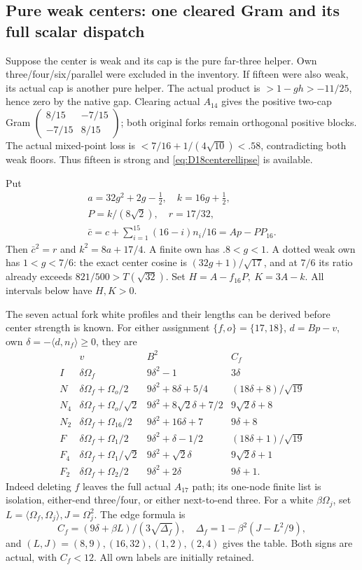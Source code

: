 \documentclass[11pt]{article}
\theoremstyle{definition}
\theoremstyle{remark}
\newcommand{\ip}[2]{\langle #1,#2\rangle}
\begin{document}
\subsection{Pure weak centers: one cleared Gram and its full scalar dispatch}
\label{app:D18purecenter}
Suppose the center is weak and its cap is the pure far-three helper.
Own three/four/six/parallel were excluded in the inventory.
If fifteen were also weak, its actual cap is another pure helper.
The actual product is \(>1-gh>-11/25\), hence zero by the native gap.
Clearing actual \(A_{14}\) gives the positive two-cap Gram
\(\left(\begin{smallmatrix}8/15&-7/15\\-7/15&8/15\end{smallmatrix}\right)\);
both original forks remain orthogonal positive blocks.
The actual mixed-point loss is \(<7/16+1/(4\sqrt{10})<.58\),
contradicting both weak floors. Thus fifteen is strong and
\eqref{eq:D18centerellipse} is available.

Put
\[
\begin{gathered}
 a=32g^2+2g-\tfrac12,\quad k=16g+\tfrac12,\\
 P=k/(8\sqrt2),\quad r=17/32,\\
 \bar c=c+\sum_{i=1}^{15}(16-i)n_i/16=Ap-PP_{16}.
\end{gathered}
\]
Then \(\bar c^2=r\) and \(k^2=8a+17/4\).
A finite own has \(.8<g<1\).
A dotted weak own has \(1<g<7/6\): the exact center cosine
is \((32g+1)/\sqrt{17}\), and at \(7/6\) its ratio already
exceeds \(821/500>T(\sqrt{32})\).
Set \(H=A-f_{16}P,\ K=3A-k\).
All intervals below have \(H,K>0\).

The seven actual fork white profiles and their lengths can be derived
before center strength is known.
For either assignment \(\{f,o\}=\{17,18\}\),
\(d=Bp-v\), own \(\delta=-\ip d{n_f}\geq0\), they are
\[
\begin{array}{c|c|c|c}
 &v&B^2&C_f\\ \hline
I&\delta\Omega_f&9\delta^2-1&3\delta\\
N&\delta\Omega_f+\Omega_o/2&9\delta^2+8\delta+5/4&(18\delta+8)/\sqrt{19}\\
N_4&\delta\Omega_f+\Omega_o/\sqrt2&9\delta^2+8\sqrt2\delta+7/2&9\sqrt2\delta+8\\
N_2&\delta\Omega_f+\Omega_{16}/2&9\delta^2+16\delta+7&9\delta+8\\
F&\delta\Omega_f+\Omega_1/2&9\delta^2+\delta-1/2&(18\delta+1)/\sqrt{19}\\
F_4&\delta\Omega_f+\Omega_1/\sqrt2&9\delta^2+\sqrt2\delta&9\sqrt2\delta+1\\
F_2&\delta\Omega_f+\Omega_2/2&9\delta^2+2\delta&9\delta+1 .
\end{array}
\]
Indeed deleting \(f\) leaves the full actual \(A_{17}\) path;
its one-node finite list is isolation, either-end three/four,
or either next-to-end three.
For a white \(\beta\Omega_j\), set
\(L=\ip{\Omega_f}{\Omega_j},J=\Omega_j^2\).
The edge formula is
\[
 C_f=(9\delta+\beta L)/(3\sqrt{\Delta_f}),\quad
 \Delta_f=1-\beta^2(J-L^2/9),
\]
and \((L,J)=(8,9),(16,32),(1,2),(2,4)\) gives the table.
Both signs are actual, with \(C_f<12\).
All own labels are initially retained.
\end{document}
